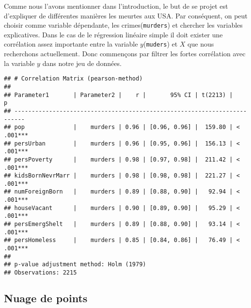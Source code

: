 \documentclass[
]{book}
\newenvironment{Shaded}{\begin{snugshade}}{\end{snugshade}}
\newcommand{\CommentTok}[1]{\textcolor[rgb]{0.56,0.35,0.01}{\textit{#1}}}
\newcommand{\FloatTok}[1]{\textcolor[rgb]{0.00,0.00,0.81}{#1}}
\newcommand{\FunctionTok}[1]{\textcolor[rgb]{0.00,0.00,0.00}{#1}}
\newcommand{\NormalTok}[1]{#1}
\newcommand{\OtherTok}[1]{\textcolor[rgb]{0.56,0.35,0.01}{#1}}
\newcommand{\SpecialCharTok}[1]{\textcolor[rgb]{0.00,0.00,0.00}{#1}}
\newcommand{\StringTok}[1]{\textcolor[rgb]{0.31,0.60,0.02}{#1}}
\begin{document}
Comme nous l'avons mentionner dans l'introduction, le but de se projet est d'expliquer de différentes manières les meurtes aux USA. Par conséquent, on peut choisir comme variable dépendante, les crimes(\texttt{murders}) et chercher les variables explicatives. Dans le cas de le régression linéaire simple il doit exister une corrélation assez importante entre la variable \(y\)(\texttt{muders}) et \(X\) que nous recherchons actuellement. Donc commençons par filtrer les fortes corrélation avec la variable \(y\) dans notre jeu de données.\\

\begin{Shaded}
\end{Shaded}

\begin{verbatim}
## # Correlation Matrix (pearson-method)
## 
## Parameter1       | Parameter2 |    r |       95% CI | t(2213) |         p
## -------------------------------------------------------------------------
## pop              |    murders | 0.96 | [0.96, 0.96] |  159.80 | < .001***
## persUrban        |    murders | 0.96 | [0.95, 0.96] |  156.13 | < .001***
## persPoverty      |    murders | 0.98 | [0.97, 0.98] |  211.42 | < .001***
## kidsBornNevrMarr |    murders | 0.98 | [0.98, 0.98] |  221.27 | < .001***
## numForeignBorn   |    murders | 0.89 | [0.88, 0.90] |   92.94 | < .001***
## houseVacant      |    murders | 0.90 | [0.89, 0.90] |   95.29 | < .001***
## persEmergShelt   |    murders | 0.89 | [0.88, 0.90] |   93.14 | < .001***
## persHomeless     |    murders | 0.85 | [0.84, 0.86] |   76.49 | < .001***
## 
## p-value adjustment method: Holm (1979)
## Observations: 2215
\end{verbatim}

\hypertarget{nuage-de-points}{%
\subsection*{Nuage de points}\label{nuage-de-points}}
\end{document}
